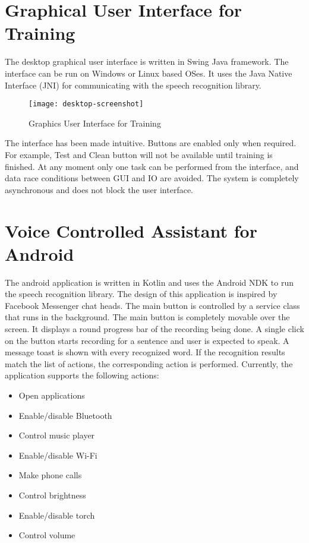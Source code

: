 \section{Graphical User Interface for Training}

The desktop graphical user interface is written in Swing Java framework. The interface can be run on Windows or Linux based OSes. It uses the Java Native Interface (JNI) for communicating with the speech recognition library.

\begin{figure}[h!]
    \centering
    \texttt{[image: desktop-screenshot]}
    \label{fig:desktop-screenshot}
    \caption{Graphics User Interface for Training}
\end{figure}

\newpage

The interface has been made intuitive. Buttons are enabled only when required. For example, Test and Clean button will not be available until training is finished. At any moment only one task can be performed from the interface, and data race conditions between GUI and IO are avoided. The system is completely asynchronous and does not block the user interface.

\section{Voice Controlled Assistant for Android}

The android application is written in Kotlin and uses the Android NDK to run the speech recognition library.
The design of this application is inspired by Facebook Messenger chat heads. The main button is controlled by a service class that runs in the background. The main button is completely movable over the screen. It displays a round progress bar of the recording being done. A single click on the button starts recording for a sentence and user is expected to speak. A message toast is shown with every recognized word. If the recognition results match the list of actions, the corresponding action is performed. Currently, the application supports the following actions:
\begin{itemize}
    \item Open applications
    \item Enable/disable Bluetooth
    \item Control music player
    \item Enable/disable Wi-Fi
    \item Make phone calls
    \item Control brightness        
    \item Enable/disable torch
    \item Control volume
\end{itemize}

